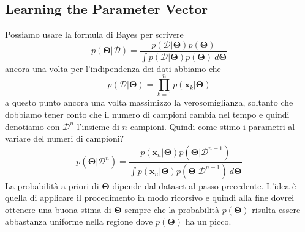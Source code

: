 \subsection{Learning the Parameter Vector}
Possiamo usare la formula di Bayes per scrivere
\begin{equation}
p(\mathbf{\Theta} | \mathcal{D}) = \frac{p(\mathcal{D}|\mathbf{\Theta}) p(\mathbf{\Theta})}{\int p(\mathcal{D}|\mathbf{\Theta}) p(\mathbf{\Theta}) \ d\mathbf{\Theta}}
\end{equation}
ancora una volta per l'indipendenza dei dati abbiamo che
\begin{equation}
p(\mathcal{D}|\mathbf{\Theta}) = \prod_{k=1}^n p(\mathbf{x}_k|\mathbf{\Theta})
\end{equation}
a questo punto ancora una volta massimizzo la verosomiglianza, soltanto che dobbiamo tener conto che il numero di campioni cambia nel tempo e quindi denotiamo con $\mathcal{D}^n$ l'insieme di $n$ campioni. Quindi come stimo i parametri al variare del numeri di campioni?
\begin{equation}
p(\mathbf{\Theta}|\mathcal{D}^n) = \frac{p(\mathbf{x}_n|\mathbf{\Theta}) p(\mathbf{\Theta}|\mathcal{D}^{n-1})}{\int p(\mathbf{x}_n|\mathbf{\Theta}) p(\mathbf{\Theta}|\mathcal{D}^{n-1}) \ d\mathbf{\Theta}}
\end{equation}
La probabilità a priori di $\mathbf{\Theta}$ dipende dal dataset al passo precedente. L'idea è quella di applicare il procedimento in modo ricorsivo e quindi alla fine dovrei ottenere una buona stima di $\mathbf{\Theta}$ sempre che la probabilità $p(\mathbf{\Theta})$ risulta essere abbastanza uniforme nella regione dove $p(\mathbf{\Theta})$ ha un picco.
 
 

